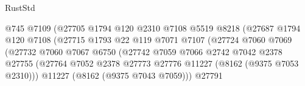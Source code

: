 \begin{lexlean}{RustStd}
\begin{coremodule}
                                              @745
                                              @7109
                                              (@27705
                                                @1794
                                                @120
                                                @2310
                                                @7108
                                                @5519
                                                @8218
                                                (@27687
                                                  @1794
                                                  @120
                                                  @7108
                                                  (@27715
                                                    @1793
                                                    @22
                                                    @119
                                                    @7071
                                                    @7107
                                                    (@27724
                                                      @7060
                                                      @7069
                                                      (@27732
                                                        @7060
                                                        @7067
                                                        @6750
                                                        (@27742
                                                          @7059
                                                          @7066
                                                          @2742
                                                          @7042
                                                          @2378
                                                          @27755
                                                          (@27764
                                                            @7052
                                                            @2378
                                                            @27773
                                                            @27776
                                                            @11227
                                                            (@8162 (@9375 @7053 @2310)))
                                                          @11227
                                                          (@8162 (@9375 @7043 @7059)))
                                                        @27791

\end{coremodule}
\end{lexlean}
